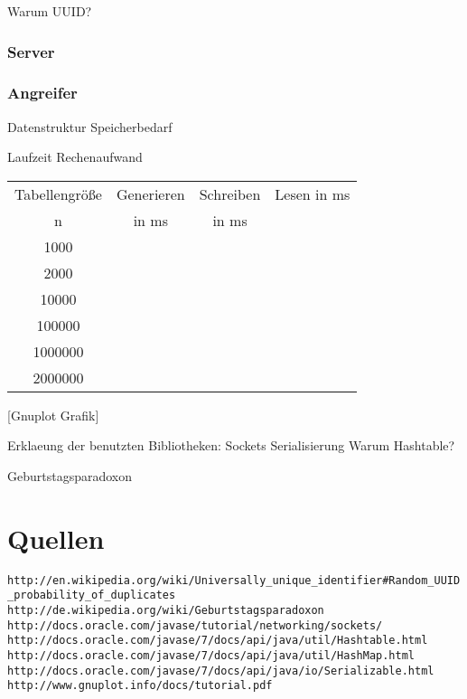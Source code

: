 \documentclass[a4paper,12pt]{article}
\begin{document}
Warum UUID?

\subsubsection{Server}

\subsubsection{Angreifer}

Datenstruktur
Speicherbedarf

Laufzeit Rechenaufwand

\begin{tabular} [h] {||c|c|c|c||} 
\hline \rule[-1.5mm]{0pt}{5.5ex} Tabellengröße & Generieren  & Schreiben & Lesen in ms\\ 
\rule[-1.5mm]{0pt}{5.5ex} n & in ms  & in ms & \\ 
\hline
\hline \rule[-1.5mm]{0pt}{5.5ex} 1000 &  & & \\ 
\hline \rule[-1.5mm]{0pt}{5.5ex} 2000 &  & & \\ 
\hline \rule[-1.5mm]{0pt}{5.5ex} 10000 &  & & \\ 
\hline \rule[-1.5mm]{0pt}{5.5ex} 100000 &  & & \\ 
\hline \rule[-1.5mm]{0pt}{5.5ex} 1000000 &  & & \\ 
\hline \rule[-1.5mm]{0pt}{5.5ex} 2000000 &  & & \\ 
\hline
\end{tabular}

[Gnuplot Grafik]

Erklaeung der benutzten Bibliotheken:
Sockets
Serialisierung
Warum Hashtable?

Geburtstagsparadoxon

\section{Quellen}

\nolinkurl{http://en.wikipedia.org/wiki/Universally_unique_identifier#Random_UUID_probability_of_duplicates}
\nolinkurl{http://de.wikipedia.org/wiki/Geburtstagsparadoxon}
\nolinkurl{http://docs.oracle.com/javase/tutorial/networking/sockets/}
\nolinkurl{http://docs.oracle.com/javase/7/docs/api/java/util/Hashtable.html}
\nolinkurl{http://docs.oracle.com/javase/7/docs/api/java/util/HashMap.html}
\nolinkurl{http://docs.oracle.com/javase/7/docs/api/java/io/Serializable.html}
\nolinkurl{http://www.gnuplot.info/docs/tutorial.pdf}
\end{document}

